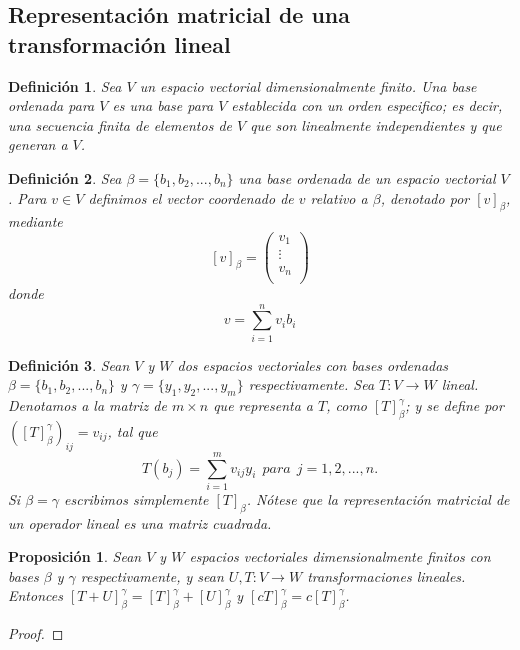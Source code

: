 \documentclass{book}
\newtheorem{proposition}{Proposición}
\newtheorem{definition}{Definición}
\begin{document}

\subsection{Representación matricial de una transformación lineal}

\begin{definition}
Sea $V$ un espacio vectorial dimensionalmente finito. Una base ordenada para $V$ es una base para $V$ establecida con un orden especifico; es decir, una secuencia finita de elementos de $V$ que son linealmente independientes y que generan a $V$.
\end{definition}

\begin{definition}
Sea $\beta =\{ b_1,b_2,...,b_n\}$ una base ordenada de un espacio vectorial $V$. Para $v\in V$ definimos el vector coordenado de $v$ relativo a $\beta$, denotado por $[ v ]_{\beta}$, mediante
\[
[v]_{\beta}=\left( \begin{array}{c} v_1\\\vdots\\ v_n\\ \end{array} \right)
\]
donde
\[
v=\sum_{i=1}^{n}v_i b_i
\]
\end{definition}

\begin{definition}
Sean $V$ y $W$ dos espacios vectoriales con bases ordenadas $\beta=\{b_1,b_2,...,b_n\}$ y $\gamma=\{y_1,y_2,...,y_m\}$ respectivamente. Sea $T:V \rightarrow W$ lineal. Denotamos a la matriz de $m\times n$ que representa a $T$, como $[T]_{\beta} ^{\gamma}$; y se define por $([T]_{\beta} ^{\gamma})_{ij}=v_{ij}$, tal que
\[
T(b_j)=\sum_{i=1}^{m}v_{ij}y_i \ \ para \ \ j=1,2,...,n.
\]
Si $\beta=\gamma$ escribimos simplemente $[T]_{\beta}$. Nótese que la representación matricial de un operador lineal es una matriz cuadrada.
\end{definition}

\begin{proposition}
Sean $V$ y $W$ espacios vectoriales dimensionalmente finitos con bases $\beta$ y $\gamma$ respectivamente, y sean $U,T:V \rightarrow W$ transformaciones lineales. Entonces $[T+U]_{\beta} ^{\gamma}=[T]_{\beta} ^{\gamma} +[U]_{\beta} ^{\gamma}$ y $[cT]_{\beta} ^{\gamma} = c[T]_{\beta} ^{\gamma}$.
\end{proposition}

\begin{proof}

\end{proof} 
\end{document}
